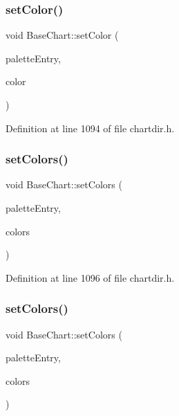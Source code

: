 \subsubsection{\texorpdfstring{set\+Color()}{setColor()}}
{\footnotesize\ttfamily void Base\+Chart\+::set\+Color (\begin{DoxyParamCaption}\item[{int}]{palette\+Entry,  }\item[{int}]{color }\end{DoxyParamCaption})\hspace{0.3cm}{\ttfamily [inline]}}



Definition at line 1094 of file chartdir.\+h.

\mbox{\label{class_base_chart_adc8642282f64647f8adf3730b4ee84a3}} 
\subsubsection{\texorpdfstring{set\+Colors()}{setColors()}\hspace{0.1cm}{\footnotesize\ttfamily [1/4]}}
{\footnotesize\ttfamily void Base\+Chart\+::set\+Colors (\begin{DoxyParamCaption}\item[{int}]{palette\+Entry,  }\item[{const int $\ast$}]{colors }\end{DoxyParamCaption})\hspace{0.3cm}{\ttfamily [inline]}}



Definition at line 1096 of file chartdir.\+h.

\mbox{\label{class_base_chart_a97a8d359493d86900dd2dd577b65c593}} 
\subsubsection{\texorpdfstring{set\+Colors()}{setColors()}\hspace{0.1cm}{\footnotesize\ttfamily [2/4]}}
{\footnotesize\ttfamily void Base\+Chart\+::set\+Colors (\begin{DoxyParamCaption}\item[{int}]{palette\+Entry,  }\item[{\hyperlink{class_int_array}{Int\+Array}}]{colors }\end{DoxyParamCaption})\hspace{0.3cm}{\ttfamily [inline]}}



